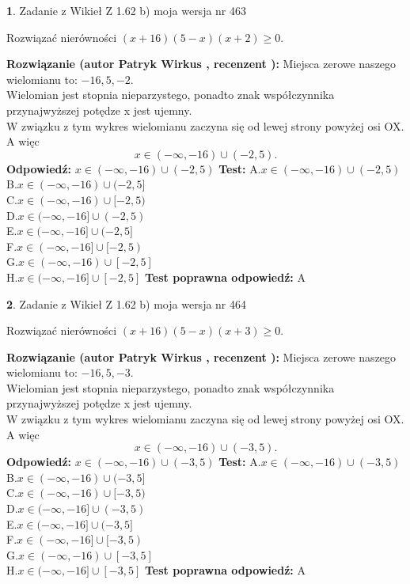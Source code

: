 \documentclass[12pt, a4paper]{article}
\theoremstyle{definition} %
\newtheorem{zad}{}
\newcommand{\zadStart}[1]{\begin{zad}#1\newline}
\newcommand{\zadStop}{\end{zad}}
\newcommand{\rozwStart}[2]{\noindent \textbf{Rozwiązanie (autor #1 , recenzent #2): }\newline}
\newcommand{\rozwStop}{\newline}
\newcommand{\odpStart}{\noindent \textbf{Odpowiedź:}\newline}
\newcommand{\odpStop}{\newline}
\newcommand{\testStart}{\noindent \textbf{Test:}\newline}
\newcommand{\testStop}{\newline}
\newcommand{\kluczStart}{\noindent \textbf{Test poprawna odpowiedź:}\newline}
\newcommand{\kluczStop}{\newline}
\begin{document}
\zadStart{Zadanie z Wikieł Z 1.62 b) moja wersja nr 463}

Rozwiązać nierówności $(x+16)(5-x)(x+2)\ge0$.
\zadStop
\rozwStart{Patryk Wirkus}{}
Miejsca zerowe naszego wielomianu to: $-16, 5, -2$.\\
Wielomian jest stopnia nieparzystego, ponadto znak współczynnika przy\linebreak najwyższej potędze x jest ujemny.\\ W związku z tym wykres wielomianu zaczyna się od lewej strony powyżej osi OX. A więc $$x \in (-\infty,-16) \cup (-2,5).$$
\rozwStop
\odpStart
$x \in (-\infty,-16) \cup (-2,5)$
\odpStop
\testStart
A.$x \in (-\infty,-16) \cup (-2,5)$\\
B.$x \in (-\infty,-16) \cup (-2,5]$\\
C.$x \in (-\infty,-16) \cup [-2,5)$\\
D.$x \in (-\infty,-16] \cup (-2,5)$\\
E.$x \in (-\infty,-16] \cup (-2,5]$\\
F.$x \in (-\infty,-16] \cup [-2,5)$\\
G.$x \in (-\infty,-16) \cup [-2,5]$\\
H.$x \in (-\infty,-16] \cup [-2,5]$
\testStop
\kluczStart
A
\kluczStop



\zadStart{Zadanie z Wikieł Z 1.62 b) moja wersja nr 464}

Rozwiązać nierówności $(x+16)(5-x)(x+3)\ge0$.
\zadStop
\rozwStart{Patryk Wirkus}{}
Miejsca zerowe naszego wielomianu to: $-16, 5, -3$.\\
Wielomian jest stopnia nieparzystego, ponadto znak współczynnika przy\linebreak najwyższej potędze x jest ujemny.\\ W związku z tym wykres wielomianu zaczyna się od lewej strony powyżej osi OX. A więc $$x \in (-\infty,-16) \cup (-3,5).$$
\rozwStop
\odpStart
$x \in (-\infty,-16) \cup (-3,5)$
\odpStop
\testStart
A.$x \in (-\infty,-16) \cup (-3,5)$\\
B.$x \in (-\infty,-16) \cup (-3,5]$\\
C.$x \in (-\infty,-16) \cup [-3,5)$\\
D.$x \in (-\infty,-16] \cup (-3,5)$\\
E.$x \in (-\infty,-16] \cup (-3,5]$\\
F.$x \in (-\infty,-16] \cup [-3,5)$\\
G.$x \in (-\infty,-16) \cup [-3,5]$\\
H.$x \in (-\infty,-16] \cup [-3,5]$
\testStop
\kluczStart
A
\kluczStop
\end{document}
